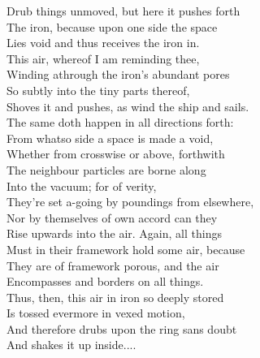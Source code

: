 Drub things unmoved, but here it pushes forth\\
The iron, because upon one side the space\\
Lies void and thus receives the iron in.\\
This air, whereof I am reminding thee,\\
Winding athrough the iron's abundant pores\\
So subtly into the tiny parts thereof,\\
Shoves it and pushes, as wind the ship and sails.\\
The same doth happen in all directions forth:\\
From whatso side a space is made a void,\\
Whether from crosswise or above, forthwith\\
The neighbour particles are borne along\\
Into the vacuum; for of verity,\\
They're set a-going by poundings from elsewhere,\\
Nor by themselves of own accord can they\\
Rise upwards into the air. Again, all things\\
Must in their framework hold some air, because\\
They are of framework porous, and the air\\
Encompasses and borders on all things.\\
Thus, then, this air in iron so deeply stored\\
Is tossed evermore in vexed motion,\\
And therefore drubs upon the ring sans doubt\\
And shakes it up inside....

